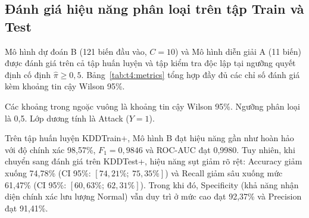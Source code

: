 \subsection{Đánh giá hiệu năng phân loại trên tập Train và Test}
Mô hình dự đoán B (121 biến đầu vào, $C=10$) và Mô hình diễn giải A (11 biến) được đánh giá trên cả tập huấn luyện và tập kiểm tra độc lập tại ngưỡng quyết định cố định $\hat\pi \geq 0{,}5$. Bảng~\ref{tab:t4:metrics} tổng hợp đầy đủ các chỉ số đánh giá kèm khoảng tin cậy Wilson 95\%.

\begin{table}[H]
\centering
\caption{Độ đo đánh giá hiệu năng phân loại của hai mô hình trên Train và Test}
\label{tab:t4:metrics}
\small
\setlength{\tabcolsep}{3pt}
\par\smallskip\footnotesize Các khoảng trong ngoặc vuông là khoảng tin cậy Wilson 95\%. Ngưỡng phân loại là 0,5. Lớp dương tính là Attack ($Y=1$).
\end{table}

Trên tập huấn luyện KDDTrain+, Mô hình B đạt hiệu năng gần như hoàn hảo với độ chính xác 98,57\%, $F_1=0{,}9846$ và ROC-AUC đạt 0,9980. Tuy nhiên, khi chuyển sang đánh giá trên KDDTest+, hiệu năng sụt giảm rõ rệt: Accuracy giảm xuống 74,78\% (CI 95\%: $[74,21\%;\ 75,35\%]$) và Recall giảm sâu xuống mức 61,47\% (CI 95\%: $[60,63\%;\ 62,31\%]$). Trong khi đó, Specificity (khả năng nhận diện chính xác lưu lượng Normal) vẫn duy trì ở mức cao đạt 92,37\% và Precision đạt 91,41\%.

